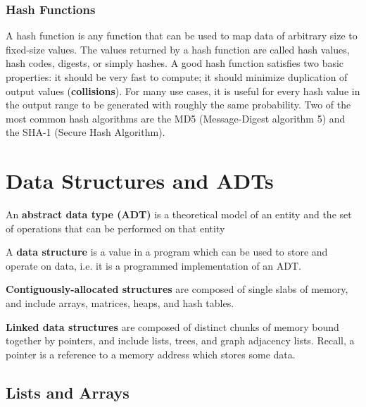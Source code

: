 \documentclass{article}
\begin{document}
    \subsubsection{Hash Functions}
        A hash function is any function that can be used to map data of arbitrary size to fixed-size values. The values returned by a hash function are called hash values, hash codes, digests, or simply hashes. 
        A good hash function satisfies two basic properties: it should be very fast to compute; it should minimize duplication of output values (\textbf{collisions}). For many use cases, it is useful for every hash value in the output range to be generated with roughly the same probability. Two of the most common hash algorithms are the MD5 (Message-Digest algorithm 5) and the SHA-1 (Secure Hash Algorithm).

\newpage
\section{Data Structures and ADTs}
    An \textbf{abstract data type (ADT)} is a theoretical model of an entity and the set of operations that can be performed on that entity
    
    A \textbf{data structure} is a value in a program which can be used to store and operate on data, i.e. it is a programmed implementation of an ADT.
    
    \textbf{Contiguously-allocated structures} are composed of single slabs of memory, and include arrays, matrices, heaps, and hash tables.
     
    \textbf{Linked data structures} are composed of distinct chunks of memory bound together by pointers, and include lists, trees, and graph adjacency lists. Recall, a pointer is a reference to a memory address which stores some data.

    \subsection{Lists and Arrays}
\end{document}
